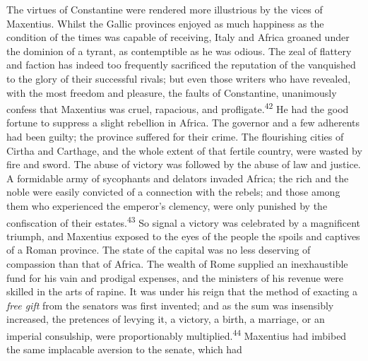

The virtues of Constantine were rendered more illustrious by the
vices of Maxentius. Whilst the Gallic provinces enjoyed as much
happiness as the condition of the times was capable of receiving,
Italy and Africa groaned under the dominion of a tyrant, as
contemptible as he was odious. The zeal of flattery and faction
has indeed too frequently sacrificed the reputation of the
vanquished to the glory of their successful rivals; but even
those writers who have revealed, with the most freedom and
pleasure, the faults of Constantine, unanimously confess that
Maxentius was cruel, rapacious, and profligate.\textsuperscript{42} He had the
good fortune to suppress a slight rebellion in Africa. The
governor and a few adherents had been guilty; the province
suffered for their crime. The flourishing cities of Cirtha and
Carthage, and the whole extent of that fertile country, were
wasted by fire and sword. The abuse of victory was followed by
the abuse of law and justice. A formidable army of sycophants and
delators invaded Africa; the rich and the noble were easily
convicted of a connection with the rebels; and those among them
who experienced the emperor’s clemency, were only punished by the
confiscation of their estates.\textsuperscript{43} So signal a victory was
celebrated by a magnificent triumph, and Maxentius exposed to the
eyes of the people the spoils and captives of a Roman province.
The state of the capital was no less deserving of compassion than
that of Africa. The wealth of Rome supplied an inexhaustible fund
for his vain and prodigal expenses, and the ministers of his
revenue were skilled in the arts of rapine. It was under his
reign that the method of exacting a \textit{free gift} from the senators
was first invented; and as the sum was insensibly increased, the
pretences of levying it, a victory, a birth, a marriage, or an
imperial consulship, were proportionably multiplied.\textsuperscript{44} Maxentius
had imbibed the same implacable aversion to the senate, which had
